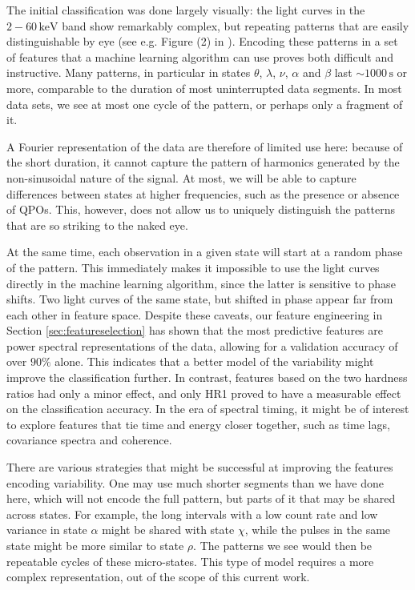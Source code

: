 \documentclass[12pt]{emulateapj}
\begin{document}
The initial classification was done largely visually: the light curves in the $2-60\,\mathrm{keV}$ band show remarkably complex, but repeating patterns that are 
easily distinguishable by eye (see e.g. Figure (2) in \citealt{belloni2000}). Encoding these patterns in a set of features that a machine learning algorithm can use proves both difficult and instructive.
Many patterns, in particular in states $\theta$, $\lambda$, $\nu$, $\alpha$ and $\beta$ last $\sim 1000\,\mathrm{s}$ or more, comparable to the duration of most 
uninterrupted data segments.
In most data sets, we see at most one cycle of the pattern, or perhaps only a fragment of it.

A Fourier representation of the data are 
therefore of limited use here: because of the short duration, it cannot capture the pattern of harmonics generated by the non-sinusoidal nature of the signal.
At most, we will be able to capture differences between states at higher frequencies, such as the presence or absence of QPOs.
This, however, does not allow us to 
uniquely distinguish the patterns that are so striking to the naked eye. 

At the same time, each observation in a given state will start at a random phase of the pattern. This immediately makes it impossible to use the light curves directly 
in the machine learning algorithm, since the latter is sensitive to phase shifts. Two light curves of the same state, but shifted in phase appear far 
from each other in feature space. Despite these caveats, our feature engineering in Section \ref{sec:featureselection} has shown that 
the most predictive features are power spectral representations of the data, allowing for a validation accuracy of over $90\%$ alone.
This indicates that a better 
model of the variability might improve the classification further. In contrast, features based on the two hardness ratios had only a minor effect, and only HR1 proved 
to have a measurable effect on the classification accuracy. In the era of spectral timing, it might be of interest to explore features that tie time and energy closer 
together, such as time lags, covariance spectra and coherence.

There are various strategies that might be successful at improving the features encoding variability. One may use much shorter segments than we have done here, 
which will not encode the full pattern, but parts of it that may be shared across states. For example, the long intervals with a low count rate and low variance in state 
$\alpha$ might be shared with state $\chi$, while the pulses in the same state might be more similar to state $\rho$. The patterns we see would then be repeatable 
cycles of these micro-states. This type of model requires a more complex representation, out of the scope of this current work. 
\end{document}
